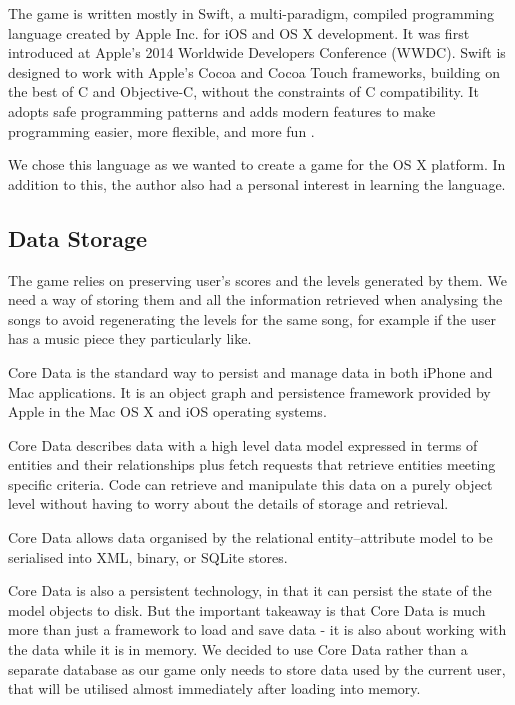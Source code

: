 The game is written mostly in Swift, a multi-paradigm, compiled programming language created by Apple Inc. for iOS and OS X development. 
It was first introduced at Apple's 2014 Worldwide Developers Conference (WWDC). Swift is designed to work with Apple's Cocoa and Cocoa Touch frameworks, building on the best of C and Objective-C, without the constraints of C compatibility. It adopts safe programming patterns and adds modern features to make programming easier, more flexible, and more fun \cite{swiftintro}. 

We chose this language as we wanted to create a game for the OS X platform. In addition to this, the author also had a personal interest in learning the language.

\vspace{10pt}


\subsection{Data Storage}

The game relies on preserving user's scores and the levels generated by them. We need a way of storing them and all the information retrieved when analysing the songs to avoid regenerating the levels for the same song, for example if the user has a music piece they particularly like.

Core Data is the standard way to persist and manage data in both iPhone and Mac applications. It is an object graph and persistence framework provided by Apple in the Mac OS X and iOS operating systems. 

Core Data describes data with a high level data model expressed in terms of entities and their relationships plus fetch requests that retrieve entities meeting specific criteria. Code can retrieve and manipulate this data on a purely object level without having to worry about the details of storage and retrieval. 

Core Data allows data organised by the relational entity–attribute model to be serialised into XML, binary, or SQLite stores.

Core Data is also a persistent technology, in that it can persist the state of the model objects to disk. But the important takeaway is that Core Data is much more than just a framework to load and save data - it is also about working with the data while it is in memory.
We decided to use Core Data rather than a separate database as our game only needs to store data used by the current user, that will be utilised almost immediately after loading into memory. 
  
